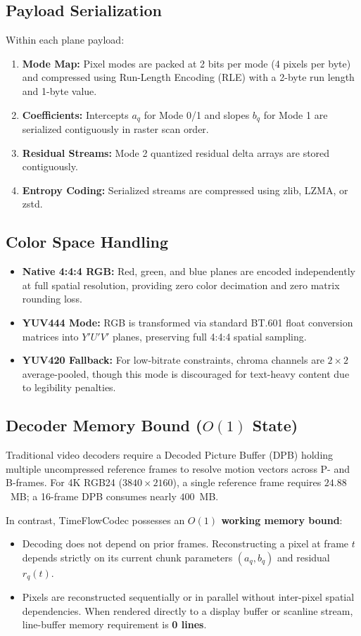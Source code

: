 \documentclass[conference]{IEEEtran}
\begin{document}
\subsection{Payload Serialization}
Within each plane payload:
\begin{enumerate}
    \item \textbf{Mode Map:} Pixel modes are packed at 2 bits per mode (4 pixels per byte) and compressed using Run-Length Encoding (RLE) with a 2-byte run length and 1-byte value.
    \item \textbf{Coefficients:} Intercepts $a_q$ for Mode 0/1 and slopes $b_q$ for Mode 1 are serialized contiguously in raster scan order.
    \item \textbf{Residual Streams:} Mode 2 quantized residual delta arrays are stored contiguously.
    \item \textbf{Entropy Coding:} Serialized streams are compressed using zlib, LZMA, or zstd.
\end{enumerate}

\subsection{Color Space Handling}
\begin{itemize}
    \item \textbf{Native 4:4:4 RGB:} Red, green, and blue planes are encoded independently at full spatial resolution, providing zero color decimation and zero matrix rounding loss.
    \item \textbf{YUV444 Mode:} RGB is transformed via standard BT.601 float conversion matrices into $Y'U'V'$ planes, preserving full 4:4:4 spatial sampling.
    \item \textbf{YUV420 Fallback:} For low-bitrate constraints, chroma channels are $2\times 2$ average-pooled, though this mode is discouraged for text-heavy content due to legibility penalties.
\end{itemize}

\subsection{Decoder Memory Bound ($O(1)$ State)}
Traditional video decoders require a Decoded Picture Buffer (DPB) holding multiple uncompressed reference frames to resolve motion vectors across P- and B-frames. For 4K RGB24 ($3840 \times 2160$), a single reference frame requires $24.88$~MB; a 16-frame DPB consumes nearly $400$~MB.

In contrast, TimeFlowCodec possesses an \textbf{$O(1)$ working memory bound}:
\begin{itemize}
    \item Decoding does not depend on prior frames. Reconstructing a pixel at frame $t$ depends strictly on its current chunk parameters $(a_q, b_q)$ and residual $r_q(t)$.
    \item Pixels are reconstructed sequentially or in parallel without inter-pixel spatial dependencies. When rendered directly to a display buffer or scanline stream, line-buffer memory requirement is \textbf{0 lines}.
\end{itemize}
\end{document}
